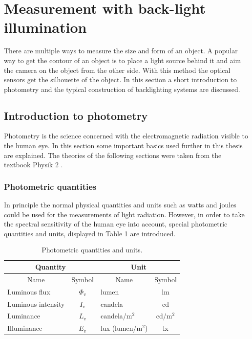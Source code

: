 \section{Measurement with back-light illumination}
There are multiple ways to measure the size and form of an object. A popular way to get the contour of an object is to place a light source behind it and aim the camera on the object from the other side. With this method the optical sensors get the silhouette of the object. In this section a short introduction to photometry and the typical construction of backlighting systems are discussed.
\subsection{Introduction to photometry}
Photometry is the science concerned with the electromagnetic radiation visible to the human eye. In this section some important basics used further in this thesis are explained. The theories of the following sections were taken from the textbook Physik 2 \cite{ruh}.
\subsubsection{Photometric quantities}
In principle the normal physical quantities and units such as watts and joules could be used for the measurements of light radiation. However, in order to take the spectral sensitivity of the human eye into account, special photometric quantities and units, displayed in Table \ref{theory:photo} are introduced.\\

\begin{table}[ht]
\centering
\begin{tabular}{ |p{6cm} p{2cm}|p{6cm} p{2cm}|  }
	\hline
	\multicolumn{2}{|c}{Quantity}&\multicolumn{2}{|c|}{Unit} \\
	\hline\hline
	\multicolumn{1}{|c}{Name}			& \multicolumn{1}{|c|}{Symbol}	& \multicolumn{1}{c}{Name}	& \multicolumn{1}{|c|}{Symbol}	\\

	\hline
	Luminous flux		& \multicolumn{1}{|c|}{$\Phi_v$}	& lumen		& \multicolumn{1}{|c|}{lm}\\
	Luminous intensity 	& \multicolumn{1}{|c|}{$I_v$} 		& candela	& \multicolumn{1}{|c|}{cd}\\
	Luminance			& \multicolumn{1}{|c|}{$L_v$}		& candela/$\text{m}^2$	& \multicolumn{1}{|c|}{cd/$\text{m}^2$}\\
	Illuminance 		& \multicolumn{1}{|c|}{$E_v$} 		& lux (lumen/$\text{m}^2$) 	& \multicolumn{1}{|c|}{lx}\\

	\hline
\end{tabular}
\caption{Photometric quantities and units. \label{theory:photo}}
\end{table}

